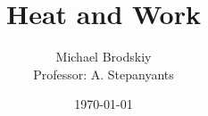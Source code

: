 


\title{Heat and Work}
\date{\today}
\author{Michael Brodskiy\\ \small Professor: A. Stepanyants}



\maketitle

